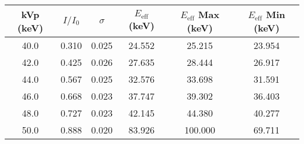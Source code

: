 \begin{tabular}{cccccc}
\toprule
 kVp (keV) &  $I/I_0$ &  $\sigma$ &  $E_{\text{eff}}$ (keV) &  $E_{\text{eff}}$ Max (keV) &  $E_{\text{eff}}$ Min (keV) \\
\midrule
      40.0 &               0.310 &                                  0.025 &                  24.552 &                      25.215 &                      23.954 \\
      42.0 &               0.425 &                                  0.026 &                  27.635 &                      28.444 &                      26.917 \\
      44.0 &               0.567 &                                  0.025 &                  32.576 &                      33.698 &                      31.591 \\
      46.0 &               0.668 &                                  0.023 &                  37.747 &                      39.302 &                      36.403 \\
      48.0 &               0.727 &                                  0.023 &                  42.145 &                      44.380 &                      40.277 \\
      50.0 &               0.888 &                                  0.020 &                  83.926 &                     100.000 &                      69.711 \\
\bottomrule
\end{tabular}
